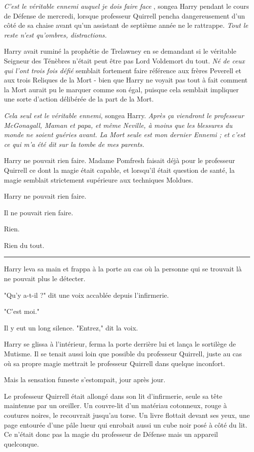 \emph{C'est le véritable ennemi auquel je dois faire face} , songea Harry pendant le cours de Défense de mercredi, lorsque professeur Quirrell pencha dangereusement d'un côté de sa chaise avant qu'un assistant de septième année ne le rattrappe. \emph{Tout le reste n'est qu'ombres, distractions.} 

Harry avait ruminé la prophétie de Trelawney en se demandant si le véritable Seigneur des Ténèbres n'était peut être pas Lord Voldemort du tout. \emph{Né de ceux qui l'ont trois fois défié}  semblait fortement faire référence aux frères Peverell et aux trois Reliques de la Mort - bien que Harry ne voyait pas tout à fait comment la Mort aurait pu le marquer comme son égal, puisque cela semblait impliquer une sorte d'action délibérée de la part de la Mort.

\emph{Cela seul est le véritable ennemi,}  songea Harry. \emph{Après ça viendront le professeur McGonagall, Maman et papa, et même Neville, à moins que les blessures du monde ne soient guéries avant. La Mort seule est mon dernier Ennemi ; et c'est ce qui m'a été dit sur la tombe de mes parents.} 

Harry ne pouvait rien faire. Madame Pomfresh faisait déjà pour le professeur Quirrell ce dont la magie était capable, et lorsqu'il était question de santé, la magie semblait strictement supérieure aux techniques Moldues.

Harry ne pouvait rien faire.

Il ne pouvait rien faire.

Rien.

Rien du tout.
\par\noindent\rule{\textwidth}{0.4pt}
Harry leva sa main et frappa à la porte au cas où la personne qui se trouvait là ne pouvait plus le détecter.

"Qu'y a-t-il ?" dit une voix accablée depuis l'infirmerie.

"C'est moi."

Il y eut un long silence. "Entrez," dit la voix.

Harry se glissa à l'intérieur, ferma la porte derrière lui et lança le sortilège de Mutisme. Il se tenait aussi loin que possible du professeur Quirrell, juste au cas où sa propre magie mettrait le professeur Quirrell dans quelque inconfort.

Mais la sensation funeste s'estompait, jour après jour.

Le professeur Quirrell était allongé dans son lit d'infirmerie, seule sa tête maintenue par un oreiller. Un couvre-lit d'un matériau cotonneux, rouge à coutures noires, le recouvrait jusqu'au torse. Un livre flottait devant ses yeux, une page entourée d'une pâle lueur qui enrobait aussi un cube noir posé à côté du lit. Ce n'était donc pas la magie du professeur de Défense mais un appareil quelconque.

